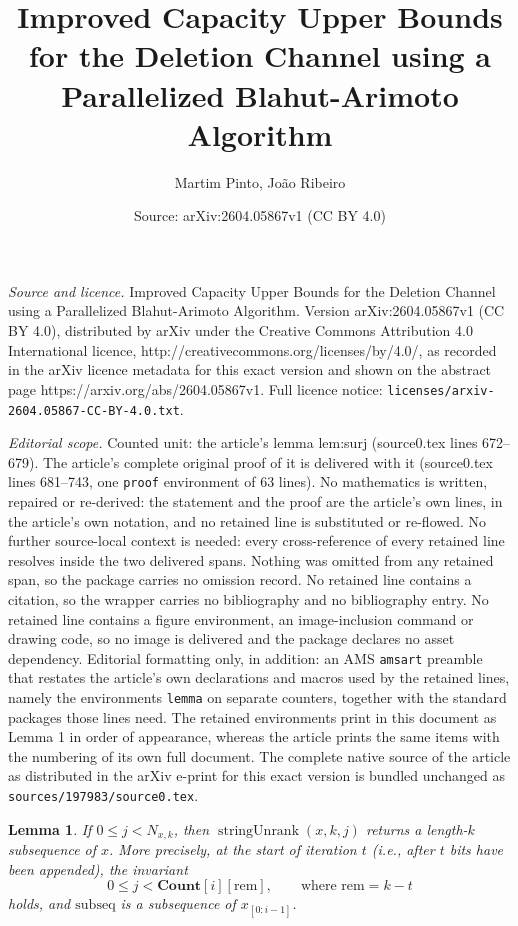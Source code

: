 \documentclass[10pt,a4paper]{amsart}
\title{Improved Capacity Upper Bounds for the Deletion Channel using a Parallelized Blahut-Arimoto Algorithm}
\author{Martim Pinto, Jo\~ao Ribeiro}
\date{Source: arXiv:2604.05867v1 (CC BY 4.0)}
\newtheorem{lemma}{Lemma}
\newcommand{\Cnt}{\mathbf{Count}}
\newcommand{\rem}{\mathrm{rem}}
\newcommand{\subseq}{\mathrm{subseq}}
\newcommand{\unrankk}{\operatorname{stringUnrank}}
\begin{document}
\maketitle

\noindent\emph{Source and licence.} Improved Capacity Upper Bounds for the Deletion Channel using a Parallelized Blahut-Arimoto Algorithm. Version arXiv:2604.05867v1 (CC BY 4.0), distributed by arXiv under the Creative Commons Attribution 4.0 International licence, http://creativecommons.org/licenses/by/4.0/, as recorded in the arXiv licence metadata for this exact version and shown on the abstract page https://arxiv.org/abs/2604.05867v1. Full licence notice: \texttt{licenses/arxiv-2604.05867-CC-BY-4.0.txt}.\par\smallskip

\noindent\textit{Editorial scope.} Counted unit: the article's lemma lem:surj (source0.tex lines 672--679). The article's complete original proof of it is delivered with it (source0.tex lines 681--743, one \texttt{proof} environment of 63 lines). No mathematics is written, repaired or re-derived: the statement and the proof are the article's own lines, in the article's own notation, and no retained line is substituted or re-flowed.  No further source-local context is needed: every cross-reference of every retained line resolves inside the two delivered spans.  Nothing was omitted from any retained span, so the package carries no omission record.  No retained line contains a citation, so the wrapper carries no bibliography and no bibliography entry.  No retained line contains a figure environment, an image-inclusion command or drawing code, so no image is delivered and the package declares no asset dependency.  Editorial formatting only, in addition: an AMS \texttt{amsart} preamble that restates the article's own declarations and macros used by the retained lines, namely the environments \texttt{lemma} on separate counters, together with the standard packages those lines need.  The retained environments print in this document as Lemma 1 in order of appearance, whereas the article prints the same items with the numbering of its own full document.  The complete native source of the article as distributed in the arXiv e-print for this exact version is bundled unchanged as \texttt{sources/197983/source0.tex}.
\begin{lemma}\label{lem:surj}
If $0\le j<N_{x,k}$, then $\unrankk(x,k,j)$ returns a length-$k$ subsequence of $x$. 
More precisely, at the start of iteration $t$ (i.e., after $t$ bits have been appended), the invariant
\[
0 \le j < \Cnt[i][\rem],\qquad \text{where }\rem=k-t
\]
holds, and $\subseq$ is a subsequence of $x_{[0: i-1]}$.
\end{lemma}
\end{document}
